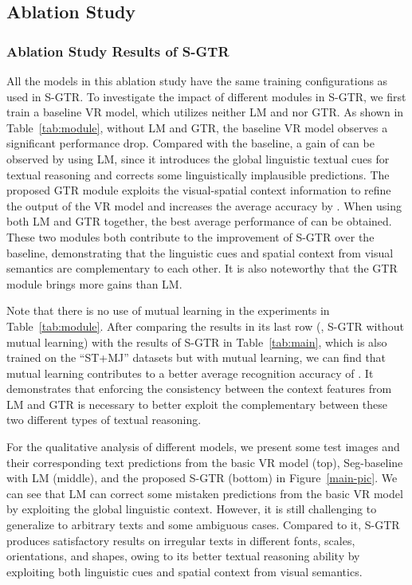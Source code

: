 \documentclass[letterpaper]{article} \usepackage{aaai22}  \usepackage{times}  \usepackage{helvet}  \usepackage{courier}  \usepackage[hyphens]{url}  \usepackage{graphicx} \urlstyle{rm} \def\UrlFont{\rm}  \usepackage{natbib}  \usepackage{caption} \DeclareCaptionStyle{ruled}{labelfont=normalfont,labelsep=colon,strut=off} \frenchspacing  \setlength{\pdfpagewidth}{8.5in}  \setlength{\pdfpageheight}{11in}
\begin{document}
\subsection{Ablation Study}
\subsubsection{Ablation Study Results of S-GTR}
All the models in this ablation study have the same training configurations as used in S-GTR. To investigate the impact of different modules in S-GTR, we first train a baseline VR model, which utilizes neither LM and nor GTR. As shown in Table~\ref{tab:module}, without LM and GTR, the baseline VR model observes a significant performance drop. Compared with the baseline, a gain of  can be observed by using LM, since it introduces the global linguistic textual cues for textual reasoning and corrects some linguistically implausible predictions. The proposed GTR module exploits the visual-spatial context information to refine the output of the VR model and increases the average accuracy by . When using both LM and GTR together, the best average performance of  can be obtained. These two modules both contribute to the improvement of S-GTR over the baseline, demonstrating that the linguistic cues and spatial context from visual semantics are complementary to each other. It is also noteworthy that the GTR module brings more gains than LM. 

Note that there is no use of mutual learning in the experiments in Table~\ref{tab:module}. After comparing the results in its last row (, S-GTR without mutual learning) with the results of S-GTR in Table~\ref{tab:main}, which is also trained on the ``ST+MJ'' datasets but with mutual learning, we can find that mutual learning contributes to a better average recognition accuracy of . It demonstrates that enforcing the consistency between the context features from LM and GTR is necessary to better exploit the complementary between these two different types of textual reasoning.



For the qualitative analysis of different models, we present some test images and their corresponding text predictions from the basic VR model (top), Seg-baseline with LM (middle), and the proposed S-GTR (bottom) in Figure~\ref{main-pic}. We can see that LM can correct some mistaken predictions from the basic VR model by exploiting the global linguistic context. However, it is still challenging to generalize to arbitrary texts and some ambiguous cases. Compared to it, S-GTR produces satisfactory results on irregular texts in different fonts, scales, orientations, and shapes, owing to its better textual reasoning ability by exploiting both linguistic cues and spatial context from visual semantics.
\end{document}
